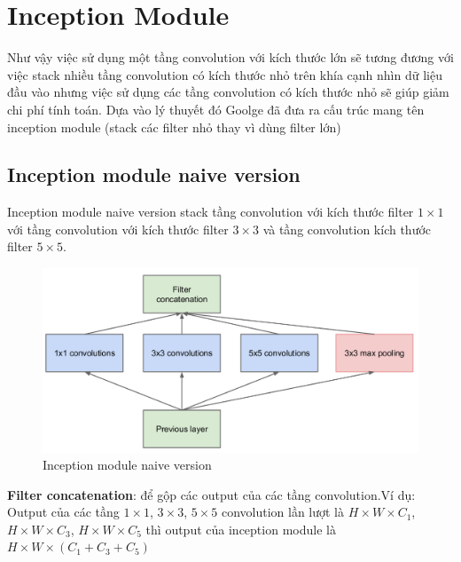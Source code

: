 \documentclass[a4paper,12pt]{report}
\begin{document}
\section{Inception Module \cite{googlenet}}	
\par Như vậy việc sử dụng một tầng convolution với kích thước lớn sẽ tương đương với việc stack nhiều tầng convolution có kích thước nhỏ trên khía cạnh nhìn dữ liệu đầu vào nhưng việc sử dụng các tầng convolution có kích thước nhỏ sẽ giúp giảm chi phí tính toán. Dựa vào lý thuyết đó Goolge đã đưa ra cấu trúc mang tên inception module (stack các filter nhỏ thay vì dùng filter lớn)
\subsection{Inception module naive version}
Inception module naive version stack tầng convolution với kích thước filter $1 \times 1$ với tầng convolution với kích thước filter $3 \times 3$ và tầng convolution kích thước filter $5 \times 5$.
\begin{figure}[H]
\centering
\includegraphics[scale=0.45]{inception_naive.png}
\caption{Inception module naive version}
\end{figure}
\textbf{Filter concatenation}: để gộp các output của các tầng convolution.Ví dụ: Output của các tầng $1 \times 1$, $3 \times 3$, $5 \times 5$ convolution lần lượt là $H \times W \times C_1$, $H \times W \times C_3$, $H \times W \times C_5$ thì output của inception module là $H \times W \times (C_1+C_3+C_5)$
\end{document}
